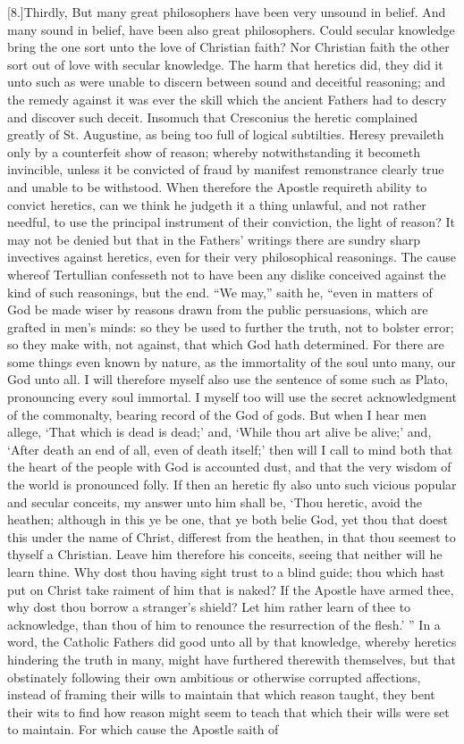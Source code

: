 [8.]Thirdly, But many great philosophers have been very unsound in belief. And many sound in belief, have been also great philosophers. Could secular knowledge bring the one sort unto the love of Christian faith? Nor Christian faith the other sort out of love with secular knowledge. The harm that heretics did, they did it unto such as were unable to discern between sound and deceitful reasoning; and the remedy against it was ever the skill which the ancient Fathers had to descry and discover such deceit. Insomuch that Cresconius the heretic complained greatly of St. Augustine, as being too full of logical subtilties. Heresy prevaileth only by a counterfeit show of reason; whereby notwithstanding it becometh invincible, unless it be convicted of fraud by manifest remonstrance clearly true and unable to be withstood. When therefore the Apostle requireth ability to convict heretics, can we think he judgeth it a thing unlawful, and not rather needful, to use the principal instrument of their conviction, the light of reason? It may not be denied but that in the Fathers’ writings there are sundry sharp invectives against heretics, even for their very philosophical reasonings. The cause whereof Tertullian confesseth not to have been any dislike conceived against the kind of such reasonings, but the end. “We may,” saith he, “even in matters of God  be made wiser by reasons drawn from the public persuasions, which are grafted in men’s minds: so they be used to further the truth, not to bolster error; so they make with, not against, that which God hath determined. For there are some things even known by nature, as the immortality of the soul unto many, our God unto all. I will therefore myself also use the sentence of some such as Plato, pronouncing every soul immortal. I myself too will use the secret acknowledgment of the commonalty, bearing record of the God of gods. But when I hear men allege, ‘That which is dead is dead;’ and, ‘While thou art alive be alive;’ and, ‘After death an end of all, even of death itself;’ then will I call to mind both that the heart of the people with God is accounted dust, and that the very wisdom of the world is pronounced folly. If then an heretic fly also unto such vicious popular and secular conceits, my answer unto him shall be, ‘Thou heretic, avoid the heathen; although in this ye be one, that ye both belie God, yet thou that doest this under the name of Christ, differest from the heathen, in that thou seemest to thyself a Christian. Leave him therefore his conceits, seeing that neither will he learn thine. Why dost thou having sight trust to a blind guide; thou which hast put on Christ take raiment of him that is naked? If the Apostle have armed thee, why dost thou borrow a stranger’s shield? Let him rather learn of thee to acknowledge, than thou of him to renounce the resurrection of the flesh.’ ” In a word, the Catholic Fathers did good  unto all by that knowledge, whereby heretics hindering the truth in many, might have furthered therewith themselves, but that obstinately following their own ambitious or otherwise corrupted affections, instead of framing their wills to maintain that which reason taught, they bent their wits to find how reason might seem to teach that which their wills were set to maintain. For which cause the Apostle saith of 